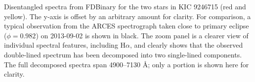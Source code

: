 \label{fig:twospectra} Disentangled spectra from FDBinary for the two stars in KIC 9246715 (red and yellow). The y-axis is offset by an arbitrary amount for clarity. For comparison, a typical observation from the ARCES spectrograph taken close to primary eclipse ($\phi = 0.982$) on 2013-09-02 is shown in black. The zoom panel is a clearer view of individual spectral features, including $\textrm{H}\alpha$, and clearly shows that the observed double-lined spectrum has been decomposed into two single-lined components. The full decomposed spectra span 4900--7130 \AA; only a portion is shown here for clarity.
  